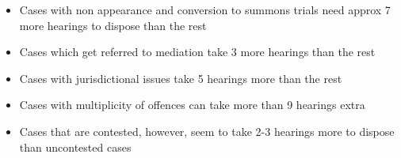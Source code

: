\begin{itemize}
\item Cases with non appearance and conversion to summons trials need
  approx 7 more hearings to dispose than the rest 
\item Cases which get
  referred to mediation take 3 more hearings than the rest 
\item Cases with
  jurisdictional issues take 5 hearings more than the rest 
\item Cases with
  multiplicity of offences can take more than 9 hearings extra 
\item Cases
  that are contested, however, seem to take 2-3 hearings more to
  dispose than uncontested cases
\end{itemize}

